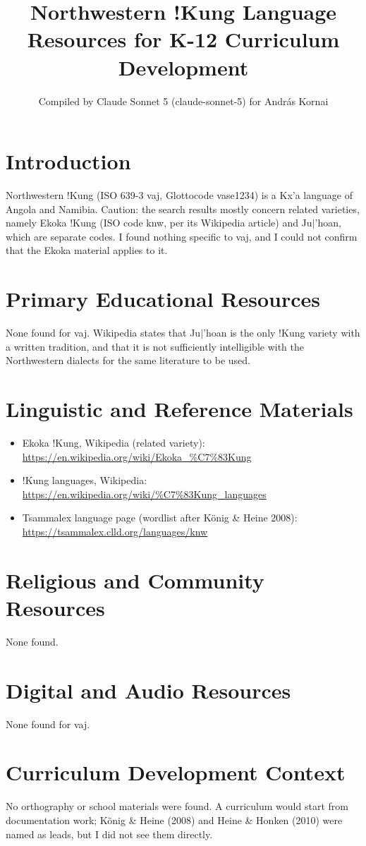 \documentclass[12pt]{article}
\title{Northwestern !Kung Language Resources for K-12 Curriculum Development}
\author{Compiled by Claude Sonnet 5 (claude-sonnet-5) for Andr\'as Kornai}
\date{}
\begin{document}
\maketitle
\section{Introduction}
Northwestern !Kung (ISO 639-3 vaj, Glottocode vase1234) is a Kx'a language of Angola and Namibia. Caution: the search results mostly concern related varieties, namely Ekoka !Kung (ISO code knw, per its Wikipedia article) and Ju$|$'hoan, which are separate codes. I found nothing specific to vaj, and I could not confirm that the Ekoka material applies to it.
\section{Primary Educational Resources}
None found for vaj. Wikipedia states that Ju$|$'hoan is the only !Kung variety with a written tradition, and that it is not sufficiently intelligible with the Northwestern dialects for the same literature to be used.
\section{Linguistic and Reference Materials}
\begin{itemize}
\item Ekoka !Kung, Wikipedia (related variety): \url{https://en.wikipedia.org/wiki/Ekoka_%C7%83Kung}
\item !Kung languages, Wikipedia: \url{https://en.wikipedia.org/wiki/%C7%83Kung_languages}
\item Tsammalex language page (wordlist after K\"onig \& Heine 2008): \url{https://tsammalex.clld.org/languages/knw}
\end{itemize}
\section{Religious and Community Resources}
None found.
\section{Digital and Audio Resources}
None found for vaj.
\section{Curriculum Development Context}
No orthography or school materials were found. A curriculum would start from documentation work; K\"onig \& Heine (2008) and Heine \& Honken (2010) were named as leads, but I did not see them directly.
\end{document}
